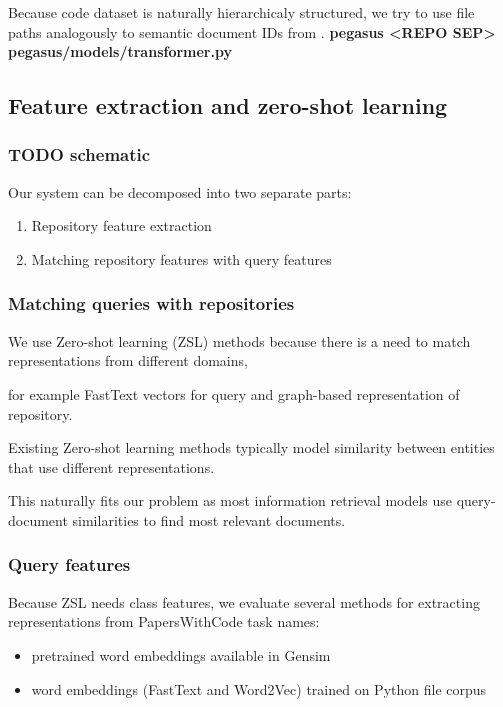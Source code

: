 \documentclass[11pt]{report}
\begin{document}
Because code dataset is naturally hierarchicaly structured, we try to use file paths analogously to semantic document IDs from \cite{differentiable_search_index}.
\textbf{pegasus <REPO SEP> pegasus/models/transformer.py 
}



\subsection{Feature extraction and zero-shot learning}
\subsubsection{TODO schematic}

Our system can be decomposed into two separate parts:

\begin{enumerate}

\item Repository feature extraction

\item Matching repository features with query features

\end{enumerate}

\subsubsection{Matching queries with repositories}

We use Zero-shot learning (ZSL) methods because there is a need to match representations from different domains,

for example FastText vectors for query and graph-based representation of repository.

Existing Zero-shot learning methods typically model similarity between entities that use different representations.

This naturally fits our problem as most information retrieval models use query-document similarities to find most relevant documents.

\subsubsection{Query features}

Because ZSL needs class features, we evaluate several methods for extracting representations from PapersWithCode task names:
\begin{itemize}
\item pretrained word embeddings available in Gensim \cite{rehurek2011gensim}
\item word embeddings (FastText and Word2Vec) trained on Python file corpus
\end{itemize}
\end{document}
